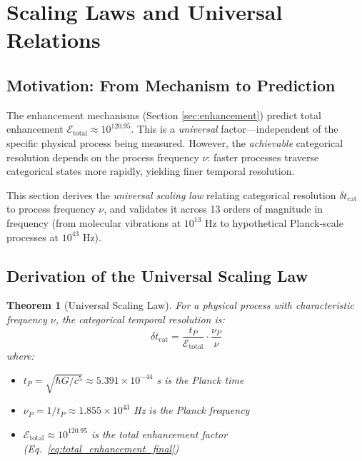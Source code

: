 \documentclass[twocolumn,10pt]{article}
\newtheorem{theorem}{Theorem}[section]
\theoremstyle{remark}
\begin{document}
\section{Scaling Laws and Universal Relations}
\label{sec:scaling}

\subsection{Motivation: From Mechanism to Prediction}

The enhancement mechanisms (Section \ref{sec:enhancement}) predict total enhancement $\mathcal{E}_{\text{total}} \approx 10^{120.95}$. This is a \textit{universal} factor—independent of the specific physical process being measured. However, the \textit{achievable} categorical resolution depends on the process frequency $\nu$: faster processes traverse categorical states more rapidly, yielding finer temporal resolution.

This section derives the \textit{universal scaling law} relating categorical resolution $\delta t_{\text{cat}}$ to process frequency $\nu$, and validates it across 13 orders of magnitude in frequency (from molecular vibrations at $10^{13}$ Hz to hypothetical Planck-scale processes at $10^{43}$ Hz).

\subsection{Derivation of the Universal Scaling Law}

\begin{theorem}[Universal Scaling Law]
\label{thm:scaling_law}
For a physical process with characteristic frequency $\nu$, the categorical temporal resolution is:
\begin{equation}
    \delta t_{\text{cat}} = \frac{t_P}{\mathcal{E}_{\text{total}}} \cdot \frac{\nu_P}{\nu}
    \label{eq:scaling_law}
\end{equation}
where:
\begin{itemize}
    \item $t_P = \sqrt{\hbar G/c^5} \approx 5.391 \times 10^{-44}$ s is the Planck time
    \item $\nu_P = 1/t_P \approx 1.855 \times 10^{43}$ Hz is the Planck frequency
    \item $\mathcal{E}_{\text{total}} \approx 10^{120.95}$ is the total enhancement factor (Eq.~\ref{eq:total_enhancement_final})
\end{itemize}
\end{theorem}
\end{document}
